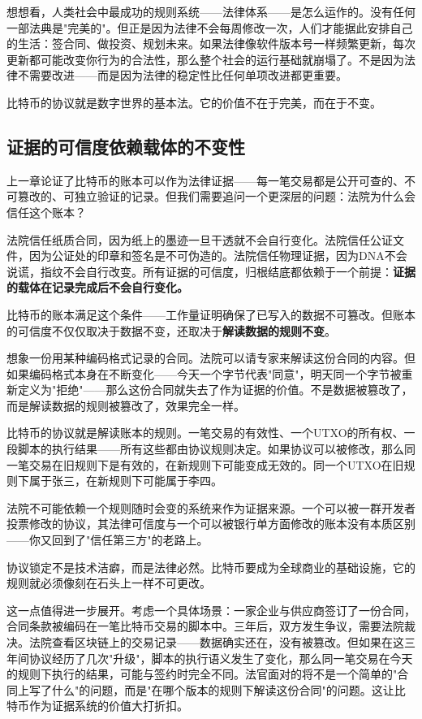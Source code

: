 \documentclass[a4paper,12pt,openany]{ctexbook}
\begin{document}
想想看，人类社会中最成功的规则系统——法律体系——是怎么运作的。没有任何一部法典是"完美的"。但正是因为法律不会每周修改一次，人们才能据此安排自己的生活：签合同、做投资、规划未来。如果法律像软件版本号一样频繁更新，每次更新都可能改变你行为的合法性，那么整个社会的运行基础就崩塌了。不是因为法律不需要改进——而是因为法律的稳定性比任何单项改进都更重要。

比特币的协议就是数字世界的基本法。它的价值不在于完美，而在于不变。


\subsection*{证据的可信度依赖载体的不变性}


上一章论证了比特币的账本可以作为法律证据——每一笔交易都是公开可查的、不可篡改的、可独立验证的记录。但我们需要追问一个更深层的问题：法院为什么会信任这个账本？

法院信任纸质合同，因为纸上的墨迹一旦干透就不会自行变化。法院信任公证文件，因为公证处的印章和签名是不可伪造的。法院信任物理证据，因为DNA不会说谎，指纹不会自行改变。所有证据的可信度，归根结底都依赖于一个前提：\textbf{证据的载体在记录完成后不会自行变化。}

比特币的账本满足这个条件——工作量证明确保了已写入的数据不可篡改。但账本的可信度不仅仅取决于数据不变，还取决于\textbf{解读数据的规则不变}。

想象一份用某种编码格式记录的合同。法院可以请专家来解读这份合同的内容。但如果编码格式本身在不断变化——今天一个字节代表"同意"，明天同一个字节被重新定义为"拒绝"——那么这份合同就失去了作为证据的价值。不是数据被篡改了，而是解读数据的规则被篡改了，效果完全一样。

比特币的协议就是解读账本的规则。一笔交易的有效性、一个UTXO的所有权、一段脚本的执行结果——所有这些都由协议规则决定。如果协议可以被修改，那么同一笔交易在旧规则下是有效的，在新规则下可能变成无效的。同一个UTXO在旧规则下属于张三，在新规则下可能属于李四。

法院不可能依赖一个规则随时会变的系统来作为证据来源。一个可以被一群开发者投票修改的协议，其法律可信度与一个可以被银行单方面修改的账本没有本质区别——你又回到了"信任第三方"的老路上。

协议锁定不是技术洁癖，而是法律必然。比特币要成为全球商业的基础设施，它的规则就必须像刻在石头上一样不可更改。

这一点值得进一步展开。考虑一个具体场景：一家企业与供应商签订了一份合同，合同条款被编码在一笔比特币交易的脚本中。三年后，双方发生争议，需要法院裁决。法院查看区块链上的交易记录——数据确实还在，没有被篡改。但如果在这三年间协议经历了几次"升级"，脚本的执行语义发生了变化，那么同一笔交易在今天的规则下执行的结果，可能与签约时完全不同。法官面对的将不是一个简单的"合同上写了什么"的问题，而是"在哪个版本的规则下解读这份合同"的问题。这让比特币作为证据系统的价值大打折扣。
\end{document}
